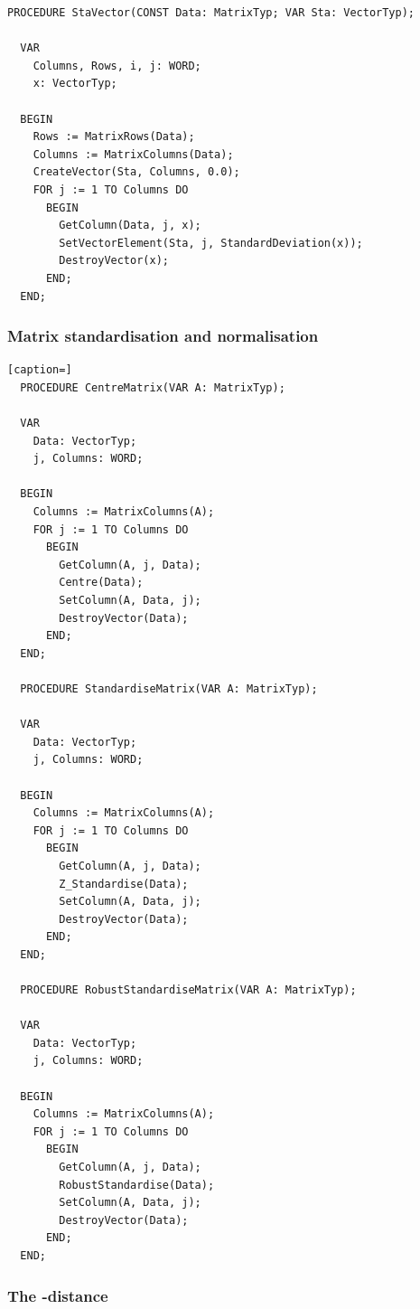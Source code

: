\begin{refsection}
\begin{lstlisting}[caption=Column standard deviation of a matrix]
  PROCEDURE StaVector(CONST Data: MatrixTyp; VAR Sta: VectorTyp);

  VAR
    Columns, Rows, i, j: WORD;
    x: VectorTyp;

  BEGIN
    Rows := MatrixRows(Data);
    Columns := MatrixColumns(Data);
    CreateVector(Sta, Columns, 0.0);
    FOR j := 1 TO Columns DO
      BEGIN
        GetColumn(Data, j, x);
        SetVectorElement(Sta, j, StandardDeviation(x));
        DestroyVector(x);
      END;
  END;
\end{lstlisting}

\subsubsection{Matrix standardisation and normalisation}


\begin{lstlisting}[caption=]
  PROCEDURE CentreMatrix(VAR A: MatrixTyp);

  VAR
    Data: VectorTyp;
    j, Columns: WORD;

  BEGIN
    Columns := MatrixColumns(A);
    FOR j := 1 TO Columns DO
      BEGIN
        GetColumn(A, j, Data);
        Centre(Data);
        SetColumn(A, Data, j);
        DestroyVector(Data);
      END;
  END;

  PROCEDURE StandardiseMatrix(VAR A: MatrixTyp);

  VAR
    Data: VectorTyp;
    j, Columns: WORD;

  BEGIN
    Columns := MatrixColumns(A);
    FOR j := 1 TO Columns DO
      BEGIN
        GetColumn(A, j, Data);
        Z_Standardise(Data);
        SetColumn(A, Data, j);
        DestroyVector(Data);
      END;
  END;

  PROCEDURE RobustStandardiseMatrix(VAR A: MatrixTyp);

  VAR
    Data: VectorTyp;
    j, Columns: WORD;

  BEGIN
    Columns := MatrixColumns(A);
    FOR j := 1 TO Columns DO
      BEGIN
        GetColumn(A, j, Data);
        RobustStandardise(Data);
        SetColumn(A, Data, j);
        DestroyVector(Data);
      END;
  END;
\end{lstlisting}

\subsubsection{The -distance }


\end{refsection}
